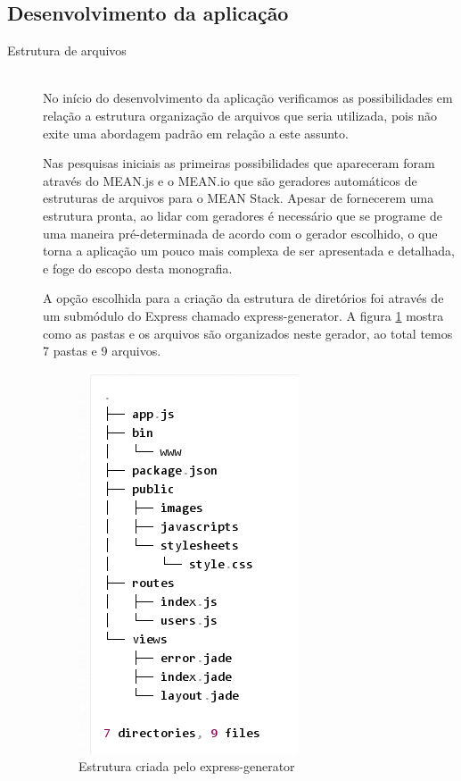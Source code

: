 
\subsection{Desenvolvimento da aplicação}
\label{subsec: Desenvolvimento da aplicação}

\begin{description}
\item[Estrutura de arquivos] \hfill \\
No início do desenvolvimento da aplicação verificamos as possibilidades em relação a estrutura  organização de arquivos que seria utilizada, pois não exite uma abordagem padrão em relação a este assunto.

Nas pesquisas iniciais as primeiras possibilidades que apareceram foram através do MEAN.js e o MEAN.io que são geradores automáticos de estruturas de arquivos para o MEAN Stack. Apesar de fornecerem uma estrutura pronta, ao lidar com geradores é necessário que se programe de uma maneira pré-determinada de acordo com o gerador escolhido, o que torna a aplicação um pouco mais complexa de ser apresentada e detalhada, e foge do escopo desta monografia.

A opção escolhida para a criação da estrutura de diretórios foi através de um submódulo do Express chamado express-generator. A figura \ref{fig: estrutura criada pelo express-generator} \cite{ExpressGen} mostra como as pastas e os arquivos são organizados neste gerador, ao total temos 7 pastas e 9 arquivos. 

    \begin{figure}[htb]
    \centering
    \includegraphics[scale=0.7]{images/estrutura_exp_gen.png}
    \caption{Estrutura criada pelo express-generator}
    \label{fig: estrutura criada pelo express-generator}
    \end{figure}


\end{description}
